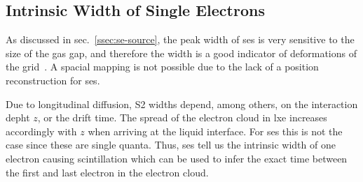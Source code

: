 
\FloatBarrier
\subsection{Intrinsic Width of Single Electrons}
\label{ssec:width}
\FloatBarrier


As discussed in sec.~\ref{ssec:se-source}, the peak width of \glspl{se} is very sensitive to the size of the gas gap, and therefore the width is a good indicator of deformations of the grid~\cite{?}.
A spacial mapping is not possible due to the lack of a position reconstruction for \glspl{se}.

Due to longitudinal diffusion, S2 widths depend, among others, on the interaction depht $ z $, or the drift time.
The spread of the electron cloud in \gls{lxe} increases accordingly with $ z $ when arriving at the liquid interface.
For \glspl{se} this is not the case since these are single quanta.
Thus, \glspl{se} tell us the intrinsic width of one electron causing scintillation which can be used to infer the exact time between the first and last electron in the electron cloud.


